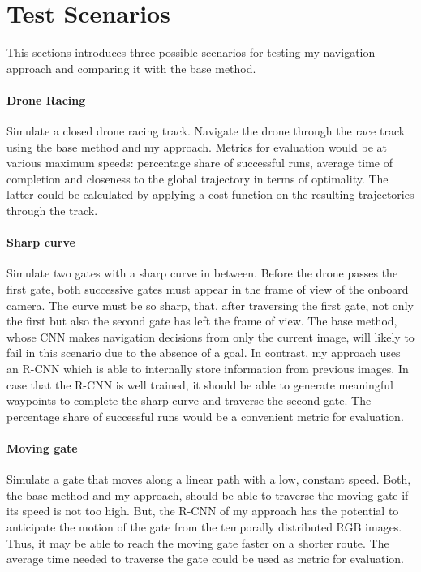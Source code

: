 \section{Test Scenarios}\label{sec:testScen}
This sections introduces three possible scenarios for testing my navigation approach and comparing it with the base method.



\paragraph{Drone Racing}
Simulate a closed drone racing track.
Navigate the drone through the race track using the base method and my approach.
Metrics for evaluation would be at various maximum speeds:
percentage share of successful runs,
average time of completion
and 
closeness to the global trajectory in terms of optimality.
The latter could be calculated by applying a cost function on the resulting trajectories through the track.


\paragraph{Sharp curve}
Simulate two gates with a sharp curve in between.
Before the drone passes the first gate,
both successive gates must appear in the frame of view of the onboard camera.
The curve must be so sharp, that, after traversing the first gate, not only the first but also the second gate has left the frame of view.
The base method, whose CNN makes navigation decisions from only the current image, will likely to fail in this scenario
due to the absence of a goal.
In contrast, my approach uses an R-CNN which is able to internally store information from previous images.
In case that the R-CNN is well trained, it should be able to generate meaningful waypoints to complete the sharp curve and traverse the second gate.
The percentage share of successful runs would be a convenient metric for evaluation.


\paragraph{Moving gate}
Simulate a gate that moves along a linear path with a low, constant speed.
Both, the base method and my approach, should be able to traverse the moving gate if its speed is not too high.
But, the R-CNN of my approach has the potential to anticipate the motion of the gate from the temporally distributed RGB images.
Thus, it may be able to reach the moving gate faster on a shorter route.
The average time needed to traverse the gate could be used as metric for evaluation.




